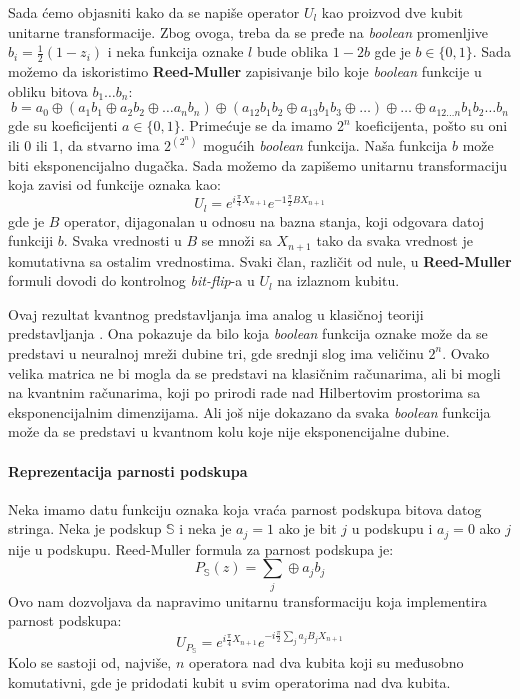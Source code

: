 \documentclass[12pt, letterpaper, oneside]{article}
\begin{document}
Sada ćemo objasniti kako da se napiše operator $U_l$ kao proizvod dve kubit unitarne transformacije. Zbog ovoga, treba da se pređe na \textit{boolean} promenljive $b_i=\frac{1}{2}(1-z_i)$ i 
neka funkcija oznake $l$ bude oblika $1-2b$ gde je $b \in \{0,1\}$. Sada možemo da iskoristimo \textbf{Reed-Muller} zapisivanje bilo koje \textit{boolean} funkcije u obliku bitova $b_1 \dots b_n$:
\[
    b = a_0 \oplus (a_1b_1 \oplus a_2b_2 \oplus \dots a_n b_n) \oplus (a_{12}b_1b_2 \oplus a_{13}b_1b_3 \oplus \dots) \oplus \dots \oplus a_{12 \dots n}b_1b_2 \dots b_n
\]
gde su koeficijenti $a \in \{0,1\}$. Primećuje se da imamo $2^n$ koeficijenta, pošto su oni ili 0 ili 1, da stvarno ima $2^{(2^n)}$ mogućih \textit{boolean} funkcija.
Naša funkcija $b$ može biti eksponencijalno dugačka. Sada možemo da zapišemo unitarnu transformaciju koja zavisi od funkcije oznaka kao:
\[
    U_l = e^{i\frac{\pi}{4}X_{n+1}}e^{-1\frac{\pi}{2}BX_{n+1}}
\]
gde je $B$ operator, dijagonalan u odnosu na bazna stanja, koji odgovara datoj funkciji $b$. 
Svaka vrednosti u $B$ se množi sa $X_{n+1}$ tako da svaka vrednost je komutativna sa ostalim vrednostima. 
Svaki član, različit od nule, u \textbf{Reed-Muller} formuli dovodi do kontrolnog \textit{bit-flip}-a u $U_l$ na izlaznom kubitu.

Ovaj rezultat kvantnog predstavljanja ima analog u klasičnoj teoriji predstavljanja \cite{Cybenko1989ApproximationBS}.
Ona pokazuje da bilo koja \textit{boolean} funkcija oznake može da se predstavi u neuralnoj mreži dubine tri, gde srednji slog ima veličinu $2^n$.
Ovako velika matrica ne bi mogla da se predstavi na klasičnim računarima, ali bi mogli na kvantnim računarima, koji po prirodi rade
nad Hilbertovim prostorima sa eksponencijalnim dimenzijama. Ali još nije dokazano da svaka \textit{boolean} funkcija može da se predstavi u kvantnom kolu koje nije eksponencijalne dubine.

\paragraph*{Reprezentacija parnosti podskupa}
Neka imamo datu funkciju oznaka koja vraća parnost podskupa bitova datog stringa. Neka je podskup $\mathbb{S}$
i neka je $a_j=1$ ako je bit $j$ u podskupu i $a_j=0$ ako $j$ nije u podskupu. Reed-Muller formula za parnost podskupa je:
\[
    P_{\mathbb{S}}(z) = \sum_j \oplus a_j b_j
\]
Ovo nam dozvoljava da napravimo unitarnu transformaciju koja implementira parnost podskupa:
\[
    U_{P_{\mathbb{S}}} = e^{i\frac{\pi}{4}X_{n+1}}e^{-i\frac{\pi}{2}\sum_j a_jB_jX_{n+1}}
\]
Kolo se sastoji od, najviše, $n$ operatora nad dva kubita koji su međusobno komutativni, gde je pridodati kubit u svim operatorima nad dva kubita.
\end{document}
